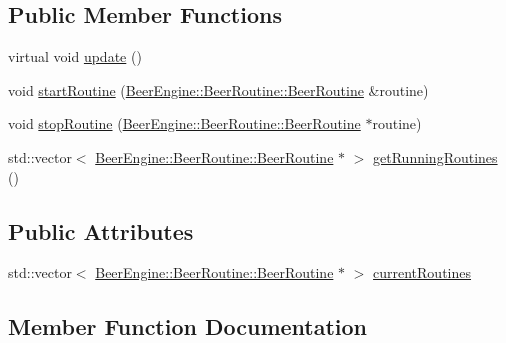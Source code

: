\subsection*{Public Member Functions}
\begin{DoxyCompactItemize}
\item 
virtual void \mbox{\hyperlink{class_beer_engine_1_1_beer_routine_1_1_a_routine_runner_a7a5253cb3a64dcb1aa66806fe7c12f62}{update}} ()
\item 
void \mbox{\hyperlink{class_beer_engine_1_1_beer_routine_1_1_a_routine_runner_a39c1caf6c18c8f6e2821dc490226279f}{start\+Routine}} (\mbox{\hyperlink{class_beer_engine_1_1_beer_routine_1_1_beer_routine}{Beer\+Engine\+::\+Beer\+Routine\+::\+Beer\+Routine}} \&routine)
\item 
void \mbox{\hyperlink{class_beer_engine_1_1_beer_routine_1_1_a_routine_runner_a3c4bff92fb1bad462946a3b48e62a44e}{stop\+Routine}} (\mbox{\hyperlink{class_beer_engine_1_1_beer_routine_1_1_beer_routine}{Beer\+Engine\+::\+Beer\+Routine\+::\+Beer\+Routine}} $\ast$routine)
\item 
std\+::vector$<$ \mbox{\hyperlink{class_beer_engine_1_1_beer_routine_1_1_beer_routine}{Beer\+Engine\+::\+Beer\+Routine\+::\+Beer\+Routine}} $\ast$ $>$ \mbox{\hyperlink{class_beer_engine_1_1_beer_routine_1_1_a_routine_runner_a6f8c4cb25ea70365de58a6dfba860d96}{get\+Running\+Routines}} ()
\end{DoxyCompactItemize}
\subsection*{Public Attributes}
\begin{DoxyCompactItemize}
\item 
std\+::vector$<$ \mbox{\hyperlink{class_beer_engine_1_1_beer_routine_1_1_beer_routine}{Beer\+Engine\+::\+Beer\+Routine\+::\+Beer\+Routine}} $\ast$ $>$ \mbox{\hyperlink{class_beer_engine_1_1_beer_routine_1_1_a_routine_runner_a529596ac2d47cd5a2efb58f93fb40ff4}{current\+Routines}}
\end{DoxyCompactItemize}


\subsection{Member Function Documentation}
\mbox{\label{class_beer_engine_1_1_beer_routine_1_1_a_routine_runner_a6f8c4cb25ea70365de58a6dfba860d96}} 
